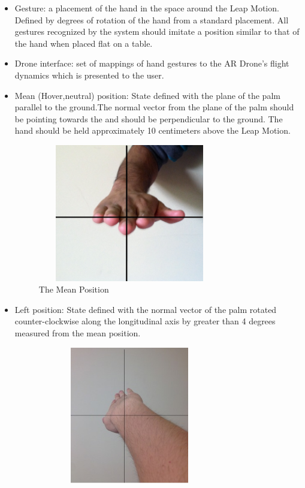 \documentclass[letterpaper,english, 12pt]{article}
\begin{document}
\begin{itemize}

		\item Gesture: a placement of the hand in the space around the Leap Motion. Defined by degrees of rotation of the hand from a standard placement. All gestures recognized by the system should imitate a position similar to that of the hand when placed flat on a table. 
		\item Drone interface: set of mappings of hand gestures to the AR Drone's flight dynamics which is presented to the user. 
		\item Mean (Hover,neutral) position: State defined with the plane of the palm parallel to the ground.The normal vector from the plane of the palm should be pointing towards the and should be perpendicular to the ground. The hand should be held approximately 10 centimeters above the Leap Motion. \\
		\begin{figure}[H]
			\centering
			\includegraphics[height=6cm, width=80mm]{pics/mean.jpg} 
			\caption{The Mean Position}
		\end{figure}
		\item Left position: State defined with the normal vector of the palm rotated counter-clockwise along the longitudinal axis by greater than 4 degrees measured from the mean position. \\
		\begin{figure}[H]
			\centering
			\includegraphics[height=6cm, width=80mm]{pics/left.jpg} 

\end{figure}
\end{itemize}
\end{document}
